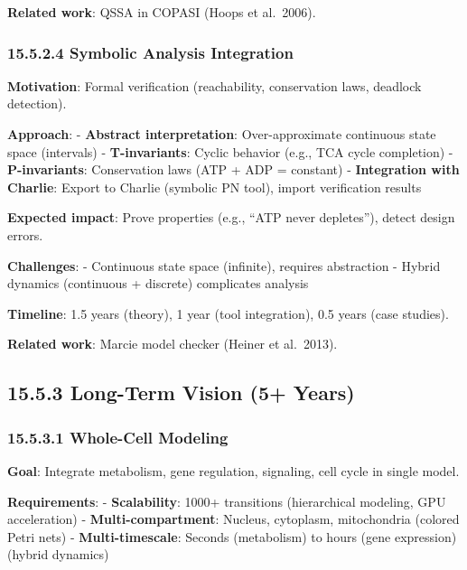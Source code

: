 \textbf{Related work}: QSSA in COPASI (Hoops et al.~2006).

\hypertarget{symbolic-analysis-integration}{%
\subsubsection{15.5.2.4 Symbolic Analysis
Integration}\label{symbolic-analysis-integration}}

\textbf{Motivation}: Formal verification (reachability, conservation
laws, deadlock detection).

\textbf{Approach}: - \textbf{Abstract interpretation}: Over-approximate
continuous state space (intervals) - \textbf{T-invariants}: Cyclic
behavior (e.g., TCA cycle completion) - \textbf{P-invariants}:
Conservation laws (ATP + ADP = constant) - \textbf{Integration with
Charlie}: Export to Charlie (symbolic PN tool), import verification
results

\textbf{Expected impact}: Prove properties (e.g., ``ATP never
depletes''), detect design errors.

\textbf{Challenges}: - Continuous state space (infinite), requires
abstraction - Hybrid dynamics (continuous + discrete) complicates
analysis

\textbf{Timeline}: 1.5 years (theory), 1 year (tool integration), 0.5
years (case studies).

\textbf{Related work}: Marcie model checker (Heiner et al.~2013).

\hypertarget{long-term-vision-5-years}{%
\subsection{15.5.3 Long-Term Vision (5+
Years)}\label{long-term-vision-5-years}}

\hypertarget{whole-cell-modeling}{%
\subsubsection{15.5.3.1 Whole-Cell Modeling}\label{whole-cell-modeling}}

\textbf{Goal}: Integrate metabolism, gene regulation, signaling, cell
cycle in single model.

\textbf{Requirements}: - \textbf{Scalability}: 1000+ transitions
(hierarchical modeling, GPU acceleration) - \textbf{Multi-compartment}:
Nucleus, cytoplasm, mitochondria (colored Petri nets) -
\textbf{Multi-timescale}: Seconds (metabolism) to hours (gene
expression) (hybrid dynamics)

